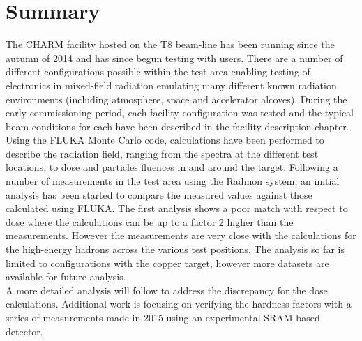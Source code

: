 \section{Summary}

The CHARM facility hosted on the T8 beam-line has been running since the autumn of 2014 and has since begun testing with users. There are a number of different configurations possible within the test area enabling testing of electronics in mixed-field radiation emulating many different known radiation environments (including atmosphere, space and accelerator alcoves). During the early commissioning period, each facility configuration was tested and the typical beam conditions for each have been described in the facility description chapter. \\

Using the FLUKA Monte Carlo code, calculations have been performed to describe the radiation field, ranging from the spectra at the different test locations, to dose and particles fluences in and around the target. Following a number of measurements in the test area using the Radmon system, an initial analysis has been started to compare the measured values against those calculated using FLUKA. The first analysis shows a poor match with respect to dose where the calculations can be up to a factor 2 higher than the measurements. However the measurements are very close with the calculations for the high-energy hadrons across the various test positions. The analysis so far is limited to configurations with the copper target, however more datasets are available for future analysis. \\

A more detailed analysis will follow to address the discrepancy for the dose calculations. Additional work is focusing on verifying the hardness factors with a series of measurements made in 2015 using an experimental SRAM based detector. \\